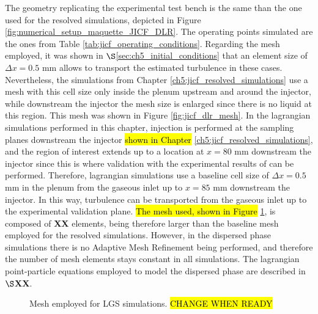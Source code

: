 The geometry replicating the experimental test bench is the same than the one used for the resolved simulations, depicted in Figure \ref{fig:numerical_setup_maquette_JICF_DLR}. The operating points simulated are the ones from Table \ref{tab:jicf_operating_conditions}. Regarding the mesh employed, it was shown in $\S$\ref{sec:ch5_initial_conditions} that an element size of $\Delta x = 0.5$ mm allows to transport the estimated turbulence in these cases. Nevertheless, the simulations from Chapter \ref{ch5:jicf_resolved_simulations} use a mesh with this cell size only inside the plenum upstream and around the injector, while downstream the injector the mesh size is enlarged since there is no liquid at this region. This mesh was shown in Figure \ref{fig:jicf_dlr_mesh}. In the lagrangian simulations performed in this chapter, injection is performed at the sampling planes downstream the injector \hl{shown in Chapter }\ref{ch5:jicf_resolved_simulations}, and the region of interest extends up to a location at $x = 80$ mm downstream the injector since this is where validation with the experimental results of  can be performed. Therefore, lagrangian simulations use a baseline cell size of $\Delta x = 0.5$ mm in the plenum from the gaseous inlet up to $x = 85$ mm downstream the injector. In this way, turbulence can be transported from the gaseous inlet  up to the experimental validation plane. \hl{The mesh used, shown in Figure} \ref{fig:jicf_dlr_mesh_LGS}, is composed of \textbf{XX} elements, being therefore larger than the baseline mesh employed for the resolved simulations. However, in the dispersed phase simulations there is no Adaptive Mesh Refinement being performed, and therefore the number of mesh elements stays constant in all simulations. The lagrangian point-particle equations employed to model the dispersed phase are described in $\S$\textbf{XX}.

\begin{figure}[h!]
	\centering
	\caption{Mesh employed for LGS simulations. \hl{CHANGE WHEN READY}}
	\label{fig:jicf_dlr_mesh_LGS}
\end{figure}

